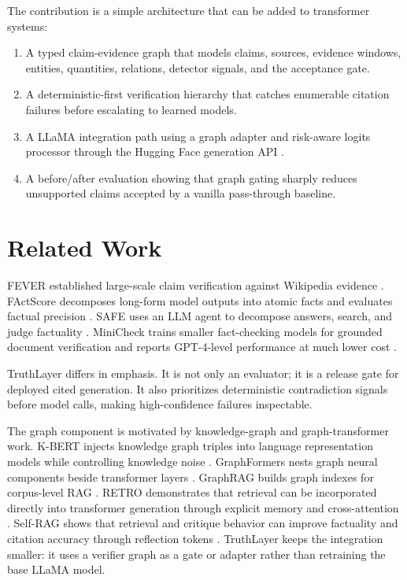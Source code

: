 \documentclass[11pt]{article}
\begin{document}
The contribution is a simple architecture that can be added to transformer systems:
\begin{enumerate}
  \item A typed claim-evidence graph that models claims, sources, evidence windows, entities, quantities, relations, detector signals, and the acceptance gate.
  \item A deterministic-first verification hierarchy that catches enumerable citation failures before escalating to learned models.
  \item A LLaMA integration path using a graph adapter and risk-aware logits processor through the Hugging Face generation API \cite{hf2026generation,hf2026llama}.
  \item A before/after evaluation showing that graph gating sharply reduces unsupported claims accepted by a vanilla pass-through baseline.
\end{enumerate}

\section{Related Work}
FEVER established large-scale claim verification against Wikipedia evidence \cite{thorne2018fever}. FActScore decomposes long-form model outputs into atomic facts and evaluates factual precision \cite{min2023factscore}. SAFE uses an LLM agent to decompose answers, search, and judge factuality \cite{wei2024safe}. MiniCheck trains smaller fact-checking models for grounded document verification and reports GPT-4-level performance at much lower cost \cite{tang2024minicheck}.

TruthLayer differs in emphasis. It is not only an evaluator; it is a release gate for deployed cited generation. It also prioritizes deterministic contradiction signals before model calls, making high-confidence failures inspectable.

The graph component is motivated by knowledge-graph and graph-transformer work. K-BERT injects knowledge graph triples into language representation models while controlling knowledge noise \cite{liu2019kbert}. GraphFormers nests graph neural components beside transformer layers \cite{yang2021graphformers}. GraphRAG builds graph indexes for corpus-level RAG \cite{edge2024graphrag}. RETRO demonstrates that retrieval can be incorporated directly into transformer generation through explicit memory and cross-attention \cite{borgeaud2022retro}. Self-RAG shows that retrieval and critique behavior can improve factuality and citation accuracy through reflection tokens \cite{asai2023selfrag}. TruthLayer keeps the integration smaller: it uses a verifier graph as a gate or adapter rather than retraining the base LLaMA model.
\end{document}

